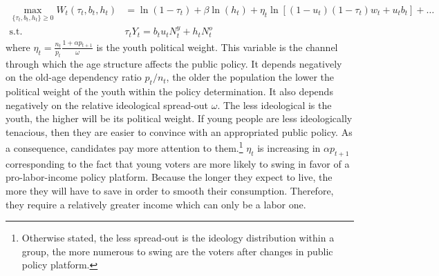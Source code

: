 	\begin{align*}
		\max_{\lbrace\tau_t, b_t, h_t\rbrace\geq 0} W_t(\tau_t, b_t, h_t) &= \ln(1-\tau_t) +\beta \ln(h_t) + \eta_t \ln\left[(1-u_t)(1-\tau_t)w_t + u_t b_t\right] + \dots \\
		\text{s.t.} ~~ &\tau_t Y_t = b_t u_t N^y_t + h_t N^o_t
	\end{align*}
where $\eta_t = \frac{n_t}{p_t}\frac{1+\alpha p_{t+1}}{\omega}$ is the youth political weight. This variable is the channel through which the age structure affects the public policy. It depends negatively on the old-age dependency ratio $p_t/n_t$, the older the population the lower the political weight of the youth within the policy determination. It also depends negatively on the relative ideological spread-out $\omega$. The less ideological is the youth, the higher will be its political weight. If young people are less ideologically tenacious, then they are easier to convince with an appropriated public policy. As a consequence, candidates pay more attention to them.\footnote{Otherwise stated, the less spread-out is the ideology distribution within a group, the more numerous to swing are the voters after changes in public policy platform.} $\eta_t$ is increasing in $\alpha p_{t+1}$ corresponding to the fact that young voters are more likely to swing in favor of a pro-labor-income policy platform. Because the longer they expect to live, the more they will have to save in order to smooth their consumption. Therefore, they require a relatively greater income which can only be a labor one.


